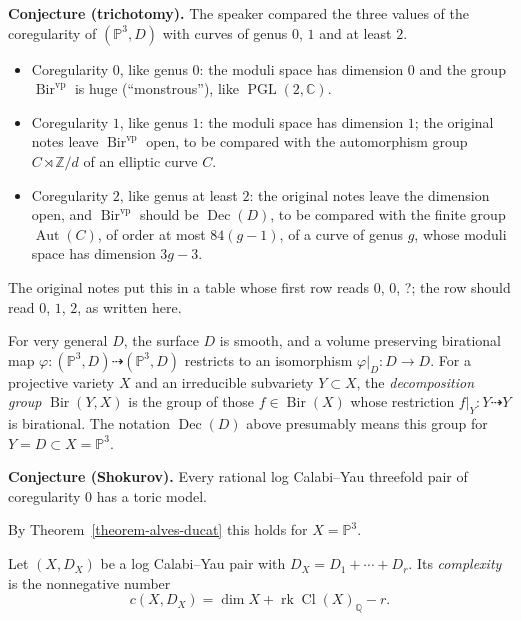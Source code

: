 \medskip\noindent
{\bf Conjecture (trichotomy).} The speaker
compared the three values of the
coregularity of $(\mathbb{P}^3,D)$ with
curves of genus $0$, $1$ and at least $2$.
\begin{itemize}
\item Coregularity $0$, like genus $0$: the
moduli space has dimension $0$ and the group
$\operatorname{Bir}^{\operatorname{vp}}$ is
huge (``monstrous''), like
$\operatorname{PGL}(2,\mathbb{C})$.
\item Coregularity $1$, like genus $1$: the
moduli space has dimension $1$; the
original notes leave
$\operatorname{Bir}^{\operatorname{vp}}$
open, to be compared with the automorphism
group $C\rtimes\mathbb{Z}/d$ of an elliptic
curve $C$.
\item Coregularity $2$, like genus at least
$2$: the original notes leave the dimension
open, and
$\operatorname{Bir}^{\operatorname{vp}}$
should be $\operatorname{Dec}(D)$, to be
compared with the finite group
$\operatorname{Aut}(C)$, of order at most
$84(g-1)$, of a curve of genus $g$, whose
moduli space has dimension $3g-3$.
\end{itemize}
The original notes put this in a table whose
first row reads $0$, $0$, ?; the row should
read $0$, $1$, $2$, as written here.

For very general $D$, the surface $D$ is
smooth, and a volume preserving birational
map
$\varphi\colon (\mathbb{P}^3,D)
\dashrightarrow (\mathbb{P}^3,D)$
restricts to an isomorphism
$\varphi|_D\colon D\to D$. For a projective
variety $X$ and an irreducible subvariety
$Y\subset X$, the \emph{decomposition group}
$\operatorname{Bir}(Y,X)$ is the group of
those $f\in\operatorname{Bir}(X)$ whose
restriction
$f|_Y\colon Y\dashrightarrow Y$ is
birational. The notation
$\operatorname{Dec}(D)$ above presumably
means this group for
$Y=D\subset X=\mathbb{P}^3$.

\medskip\noindent
{\bf Conjecture (Shokurov).} Every rational
log Calabi--Yau threefold pair of
coregularity $0$ has a toric model.

By Theorem~\ref{theorem-alves-ducat} this
holds for $X=\mathbb{P}^3$.

\begin{definition}
\label{definition-alves-complexity}
Let $(X,D_X)$ be a log Calabi--Yau pair with
$D_X=D_1+\cdots+D_r$. Its \emph{complexity}
is the nonnegative number
$$
c(X,D_X)=\dim X
+\operatorname{rk}
\operatorname{Cl}(X)_{\mathbb{Q}}
-r.
$$
\end{definition}

